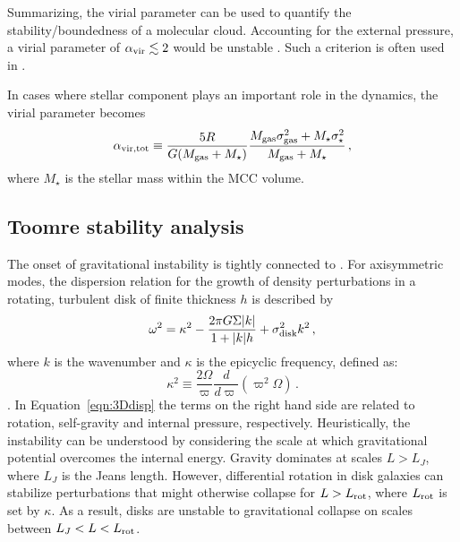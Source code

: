 \IfFileExists{emulateapjlegacy.cls}{\documentclass[iop]{emulateapjlegacy}}{\documentclass[iop]{emulateapj}}
\def\altomega{\varpi}
\begin{document}
Summarizing, the virial parameter can be used to quantify the stability/boundedness of a molecular cloud. Accounting for the external pressure, a virial parameter of $\alpha_{\rm vir}\lesssim2$ would be unstable \citep{Bertoldi92b}. Such a criterion is often used in \obs \citep[see e.g., ][]{Kauffmann17b}.

In cases where stellar component plays an important role in the dynamics, the virial parameter becomes
\begin{equation}
\alpha_{\rm vir, tot} \equiv \frac{5 R}{G (M_{\rm gas} + M_{\star})} \frac{M_{\rm gas} \sigma_{\rm gas}^2 + M_{\star} \sigma_\star^2}
					       {M_{\rm gas} + M_{\star} }\,,
\label{eqn:alpha_tot}
\end{equation}
where $M_\star$ is the stellar mass within the MCC volume.


\subsection{Toomre stability analysis}\label{sec:Q}

The onset of gravitational instability is tightly connected to \SF \citep[e.g.,][]{Kennicutt89a, Wang94a, Li05b, Li06a}. For axisymmetric modes, the dispersion relation for the growth of density perturbations in a rotating, turbulent disk of finite thickness $h$ is described by
\begin{equation}
\omega^2 = \kappa^2 - \frac{2\pi G \Sigma |k|}{1 + |k| h} + \sigma_{\rm disk}^2 k^2\,,
\label{eqn:3Ddisp}
\end{equation}
where $k$ is the wavenumber and $\kappa$ is the epicyclic frequency, defined as:
\begin{equation}
\kappa^2\equiv\frac{2\Omega}{\altomega}\frac{d}{d\altomega}\left(\altomega^2\Omega\right)\,.
\label{eqn:kappa}
\end{equation}
\citep{Romeo92a}.
In Equation~\ref{eqn:3Ddisp} the terms on the right hand side are related to rotation, self-gravity and internal pressure, respectively. Heuristically, the instability can be understood by considering the scale at which gravitational potential overcomes the internal energy. Gravity dominates at scales $L > L_J$, where $L_J$ is the Jeans length. However, differential rotation in disk galaxies can stabilize perturbations that might otherwise collapse for $L > L_{\rm rot}$, where $L_{\rm rot}$ is set by $\kappa$. As a result, disks are unstable to gravitational collapse on scales between $L_J < L < L_{\rm rot}$.
\end{document}
